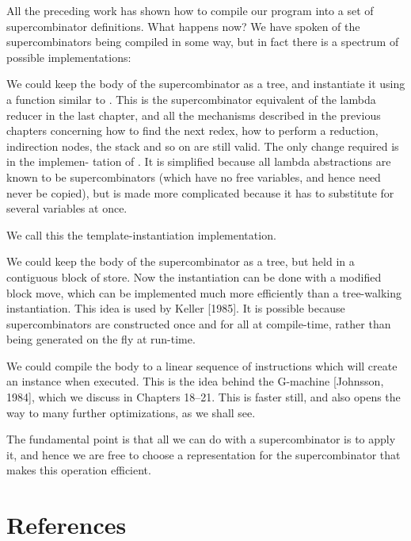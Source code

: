 All the preceding work has shown how to compile our program into a set of
supercombinator definitions. What happens now? We have spoken of the
supercombinators being compiled in some way, but in fact there is a spectrum
of possible implementations:

\begin{numbered}
    \item We could keep the body of the supercombinator as a tree, and instantiate
    it using a function similar to . This is the supercombinator
    equivalent of the lambda reducer in the last chapter, and all the
    mechanisms described in the previous chapters concerning how to find
    the next redex, how to perform a reduction, indirection nodes, the stack
    and so on are still valid. The only change required is in the implemen-
    tation of . It is simplified because all lambda abstractions are
    known to be supercombinators (which have no free variables, and hence
    need never be copied), but is made more complicated because it has to
    substitute for several variables at once.

    \phantom{xx} We call this the template-instantiation implementation.

    \item We could keep the body of the supercombinator as a tree, but held in a
    contiguous block of store. Now the instantiation can be done with a
    modified block move, which can be implemented much more efficiently
    than a tree-walking instantiation. This idea is used by Keller [1985]. It is
    possible because supercombinators are constructed once and for all at
    compile-time, rather than being generated on the fly at run-time.

    \item We could compile the body to a linear sequence of instructions which will
    create an instance when executed. This is the idea behind the G-machine
    [Johnsson, 1984], which we discuss in Chapters 18--21. This is faster still,
    and also opens the way to many further optimizations, as we shall see.
    \end{numbered}

    \noindent
    The fundamental point is that all we can do with a supercombinator is to apply
    it, and hence we are free to choose a representation for the supercombinator
    that makes this operation efficient.

    \section*{References}

